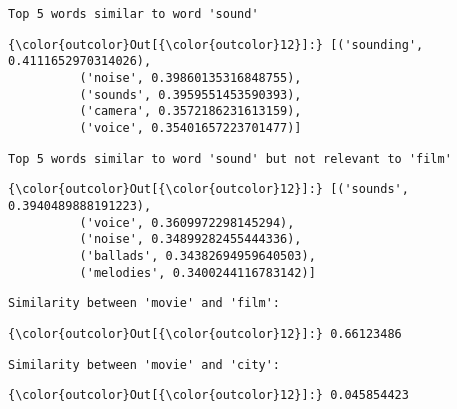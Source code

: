 \documentclass[11pt]{article}
\begin{document}
    \begin{Verbatim}[commandchars=\\\{\}]
Top 5 words similar to word 'sound'

    \end{Verbatim}

\begin{Verbatim}[commandchars=\\\{\}]
{\color{outcolor}Out[{\color{outcolor}12}]:} [('sounding', 0.4111652970314026),
          ('noise', 0.39860135316848755),
          ('sounds', 0.3959551453590393),
          ('camera', 0.3572186231613159),
          ('voice', 0.35401657223701477)]
\end{Verbatim}
            
    \begin{Verbatim}[commandchars=\\\{\}]
Top 5 words similar to word 'sound' but not relevant to 'film'

    \end{Verbatim}

\begin{Verbatim}[commandchars=\\\{\}]
{\color{outcolor}Out[{\color{outcolor}12}]:} [('sounds', 0.3940489888191223),
          ('voice', 0.3609972298145294),
          ('noise', 0.34899282455444336),
          ('ballads', 0.34382694959640503),
          ('melodies', 0.3400244116783142)]
\end{Verbatim}
            
    \begin{Verbatim}[commandchars=\\\{\}]
Similarity between 'movie' and 'film':

    \end{Verbatim}

\begin{Verbatim}[commandchars=\\\{\}]
{\color{outcolor}Out[{\color{outcolor}12}]:} 0.66123486
\end{Verbatim}
            
    \begin{Verbatim}[commandchars=\\\{\}]
Similarity between 'movie' and 'city':

    \end{Verbatim}

\begin{Verbatim}[commandchars=\\\{\}]
{\color{outcolor}Out[{\color{outcolor}12}]:} 0.045854423
\end{Verbatim}
            
\end{document}
